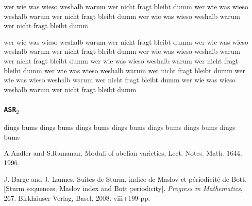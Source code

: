 \documentclass{IEEEtran}
\begin{document}
  wer wie was wieso weshalb warum wer nicht fragt bleibt dumm
  wer wie was wieso weshalb warum wer nicht fragt bleibt dumm
  wer wie was wieso weshalb warum wer nicht fragt bleibt dumm

  wer wie was wieso weshalb warum wer nicht fragt bleibt dumm
  wer wie was wieso weshalb warum wer nicht fragt bleibt dumm
  wer wie was wieso weshalb warum wer nicht fragt bleibt dumm
  wer wie was wieso weshalb warum wer nicht fragt bleibt dumm
  wer wie was wieso weshalb warum wer nicht fragt bleibt dumm
  wer wie was wieso weshalb warum wer nicht fragt bleibt dumm
  wer wie was wieso weshalb warum wer nicht fragt bleibt dumm








\maketitle


\subsubsection{{\texttt{ASR$_2$}}}
  dings bums   dings bums
   dings bums
   dings bums
   dings bums
   dings bums
   dings bums








\begin{thebibliography}{30}





A.Andler and S.Ramanan,
Moduli of abelian varieties, Lect. Notes. Math. 1644, 1996.



J. Barge and J. Lannes, Suites de Sturm, indice de Maslov et p\'eriodicit\'e
de Bott, [Sturm sequences, Maslov index and Bott periodicity],
{\em Progress in Mathematics}, 267. Birkh\"auser Verlag, Basel, 2008.
viii+199 pp.

    \end{thebibliography}
\end{document}
